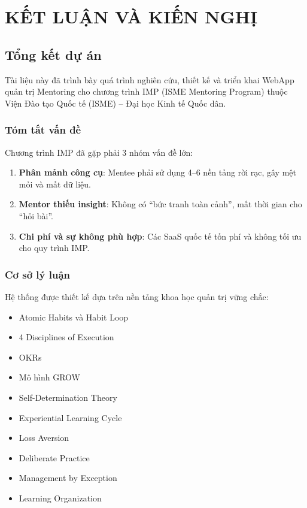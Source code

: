 \chapter{KẾT LUẬN VÀ KIẾN NGHỊ}

\section{Tổng kết dự án}
Tài liệu này đã trình bày quá trình nghiên cứu, thiết kế và triển khai WebApp quản trị Mentoring cho chương trình IMP (ISME Mentoring Program) thuộc Viện Đào tạo Quốc tế (ISME) -- Đại học Kinh tế Quốc dân.

\subsection{Tóm tắt vấn đề}
Chương trình IMP đã gặp phải 3 nhóm vấn đề lớn:
\begin{enumerate}
  \item \textbf{Phân mảnh công cụ}: Mentee phải sử dụng 4--6 nền tảng rời rạc, gây mệt mỏi và mất dữ liệu.
  \item \textbf{Mentor thiếu insight}: Không có ``bức tranh toàn cảnh'', mất thời gian cho ``hỏi bài''.
  \item \textbf{Chi phí và sự không phù hợp}: Các SaaS quốc tế tốn phí và không tối ưu cho quy trình IMP.
\end{enumerate}

\subsection{Cơ sở lý luận}
Hệ thống được thiết kế dựa trên nền tảng khoa học quản trị vững chắc:
\begin{itemize}
  \item Atomic Habits và Habit Loop \citep{atomichabits2018, duhigg2012}
  \item 4 Disciplines of Execution \citep{4dx2012}
  \item OKRs \citep{okrs2018}
  \item Mô hình GROW \citep{grow2009}
  \item Self-Determination Theory \citep{ryan2000}
  \item Experiential Learning Cycle \citep{kolb1984}
  \item Loss Aversion \citep{kahneman1979}
  \item Deliberate Practice \citep{ericsson2016}
  \item Management by Exception \citep{mbe1961}
  \item Learning Organization \citep{senge2006}
\end{itemize}

